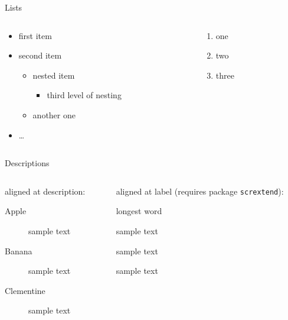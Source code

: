 \documentclass[%
  handout,
  aspectratio=1610,
  10pt,
  onlytextwidth, %
]{beamer}
\begin{document}
\begin{frame}{\secname}{Lists}
  \begin{columns}
    \begin{column}{0.5\textwidth}
      \begin{itemize}
        \item<+->first item
        \item<+->second item
        \begin{itemize}
          \item<+->nested item
          \begin{itemize}
            \item<+->third level of nesting
          \end{itemize}
          \item<+->another one
        \end{itemize}
        \item<+->\ldots
      \end{itemize}
    \end{column}

    \begin{column}{0.5\textwidth}
      \begin{enumerate}
        \item<+->one
        \item<+->two
        \item<+->three
      \end{enumerate}
    \end{column}
  \end{columns}
\end{frame}

\begin{frame}{Descriptions}
  \begin{columns}
    \begin{column}{0.5\textwidth}
      aligned at description:
      \begin{description}
        \item[Apple] sample text
        \item[Banana] sample text
        \item[Clementine] sample text
      \end{description}
    \end{column}

    \begin{column}{0.5\textwidth}
      aligned at label (requires package \texttt{scrextend}):
      \begin{labeling}{longest word}
        \item[long word] sample text
        \item[longer word] sample text
        \item[longest word] sample text
      \end{labeling}
    \end{column}
  \end{columns}
\end{frame}
\end{document}
